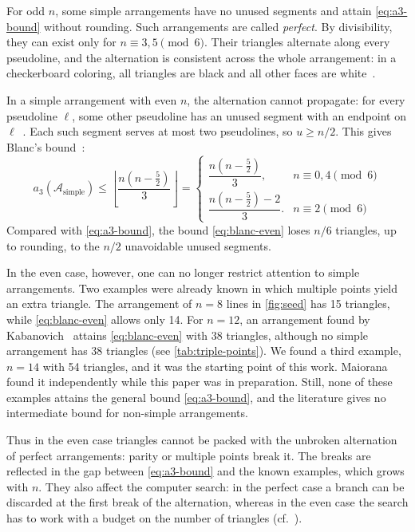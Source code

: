 For odd $n$, some simple arrangements have no unused segments and attain \eqref{eq:a3-bound} without rounding. Such arrangements are called \emph{perfect}.
By divisibility, they can exist only for $n\equiv 3,5\pmod 6$.
Their triangles alternate along every pseudoline, and the alternation is consistent across the whole arrangement: in a checkerboard coloring, all triangles are black and all other faces are white~\cite[Lemma~2.2]{pu26b}.

In a simple arrangement with even $n$, the alternation cannot propagate: for every pseudoline $\ell$, some other pseudoline has an unused segment with an endpoint on $\ell$~\cite[Proposition~2.3]{blanc11}. Each such segment serves at most two pseudolines, so $u\ge n/2$. This gives Blanc's bound~\cite[Corollary~2.4]{blanc11}:
\begin{equation}\label{eq:blanc-even}
a_{3}(\mathcal{A}_\text{simple})\le\left\lfloor\dfrac{n\left(n - \frac52\right)}{3}\right\rfloor=\begin{cases}
\dfrac{n\left(n - \frac52\right)}{3}, & n\equiv0,4\pmod 6 \\
\dfrac{n\left(n - \frac52\right) - 2}{3}. &  n\equiv2\pmod 6
\end{cases}
\end{equation}
Compared with \eqref{eq:a3-bound}, the bound \eqref{eq:blanc-even} loses $n/6$ triangles, up to rounding, to the $n/2$ unavoidable unused segments.

In the even case, however, one can no longer restrict attention to simple arrangements.
Two examples were already known in which multiple points yield an extra triangle.
The arrangement of $n=8$ lines in \cref{fig:seed} has 15 triangles, while \eqref{eq:blanc-even} allows only 14.
For $n=12$, an arrangement found by Kabanovich~\cite{khodulev99} attains \eqref{eq:blanc-even} with 38 triangles, although no simple arrangement has 38 triangles (see \cref{tab:triple-points}).
We found a third example, $n=14$ with 54 triangles, and it was the starting point of this work. Maiorana~\cite{maiorana26} found it independently while this paper was in preparation.
Still, none of these examples attains the general bound \eqref{eq:a3-bound}, and the literature gives no intermediate bound for non-simple arrangements.

Thus in the even case triangles cannot be packed with the unbroken alternation of perfect arrangements: parity or multiple points break it.
The breaks are reflected in the gap between \eqref{eq:a3-bound} and the known examples, which grows with $n$.
They also affect the computer search: in the perfect case a branch can be discarded at the first break of the alternation, whereas in the even case the search has to work with a budget on the number of triangles (cf.~\cite[Section~3]{pu26b}).

